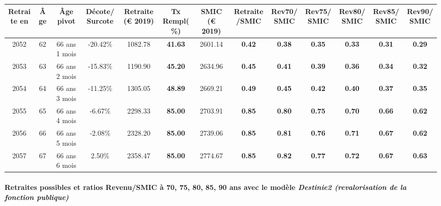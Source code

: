 { \scriptsize \begin{center} 
\begin{tabular}[htb]{|c|c||c|c||c|c||c||c|c|c|c|c|c|} 
\hline 
 Retraite en &  Âge &  Âge pivot &  Décote/Surcote &  Retraite (\euro{} 2019) &  Tx Rempl(\%) &  SMIC (\euro{} 2019) &  Retraite/SMIC &  Rev70/SMIC &  Rev75/SMIC &  Rev80/SMIC &  Rev85/SMIC &  Rev90/SMIC \\ 
\hline \hline 
 2052 &  62 &  66 ans 1 mois &  -20.42\% &  1082.78 &  {\bf 41.63} &  2601.14 &  {\bf {\color{red} 0.42}} &  {\bf {\color{red} 0.38}} &  {\bf {\color{red} 0.35}} &  {\bf {\color{red} 0.33}} &  {\bf {\color{red} 0.31}} &  {\bf {\color{red} 0.29}} \\ 
\hline 
 2053 &  63 &  66 ans 2 mois &  -15.83\% &  1190.90 &  {\bf 45.20} &  2634.96 &  {\bf {\color{red} 0.45}} &  {\bf {\color{red} 0.41}} &  {\bf {\color{red} 0.39}} &  {\bf {\color{red} 0.36}} &  {\bf {\color{red} 0.34}} &  {\bf {\color{red} 0.32}} \\ 
\hline 
 2054 &  64 &  66 ans 3 mois &  -11.25\% &  1305.05 &  {\bf 48.89} &  2669.21 &  {\bf {\color{red} 0.49}} &  {\bf {\color{red} 0.45}} &  {\bf {\color{red} 0.42}} &  {\bf {\color{red} 0.40}} &  {\bf {\color{red} 0.37}} &  {\bf {\color{red} 0.35}} \\ 
\hline 
 2055 &  65 &  66 ans 4 mois &  -6.67\% &  2298.33 &  {\bf 85.00} &  2703.91 &  {\bf {\color{red} 0.85}} &  {\bf {\color{red} 0.80}} &  {\bf {\color{red} 0.75}} &  {\bf {\color{red} 0.70}} &  {\bf {\color{red} 0.66}} &  {\bf {\color{red} 0.62}} \\ 
\hline 
 2056 &  66 &  66 ans 5 mois &  -2.08\% &  2328.20 &  {\bf 85.00} &  2739.06 &  {\bf {\color{red} 0.85}} &  {\bf {\color{red} 0.81}} &  {\bf {\color{red} 0.76}} &  {\bf {\color{red} 0.71}} &  {\bf {\color{red} 0.67}} &  {\bf {\color{red} 0.62}} \\ 
\hline 
 2057 &  67 &  66 ans 6 mois &  2.50\% &  2358.47 &  {\bf 85.00} &  2774.67 &  {\bf {\color{red} 0.85}} &  {\bf {\color{red} 0.82}} &  {\bf {\color{red} 0.77}} &  {\bf {\color{red} 0.72}} &  {\bf {\color{red} 0.67}} &  {\bf {\color{red} 0.63}} \\ 
\hline 
\hline 
\end{tabular} 
\end{center} } 
\paragraph{Retraites possibles et ratios Revenu/SMIC à 70, 75, 80, 85, 90 ans avec le modèle \emph{Destinie2 (revalorisation de la fonction publique)}}  
 
